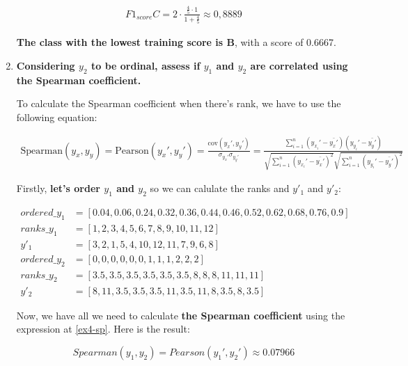 \documentclass[12pt]{article}
\begin{document}
\begin{enumerate}[leftmargin=\labelsep]
    \[
        \begin{aligned}
            F1_{score} C = 2 \cdot \frac{{ \frac{4}{5} \cdot 1 }}{{ 1 + \frac{4}{5} }} \approx 0,8889
        \end{aligned}
    \]

    \textbf{The class with the lowest training score is B}, with a score of 0.6667.

    \item \textbf{Considering $y_2$ to be ordinal, assess if $y_1$ and $y_2$ are correlated using the Spearman coefficient.}

    \vskip 0.3cm

    To calculate the Spearman coefficient when there's rank, we have to use the following equation:

    \begin{equation}\label{ex4-sp}
        \begin{split}
            \text{Spearman}(y_x, y_y) = \text{Pearson}(y_x', y_y') = \frac{\text{cov}(y_x', y_y')}{\sigma_{y_x'} \sigma_{y_y'}}
            = \frac{\sum_{i=1}^{n} (y_{x_i}' - \bar{y_x'})(y_{y_i}' - \bar{y_y'})}{\sqrt{\sum_{i=1}^{n} (y_{x_i}' - \bar{y_x'})^2}\sqrt{\sum_{i=1}^{n} (y_{y_i}' - \bar{y_y'})^2}}
        \end{split}
    \end{equation}

    Firstly, \textbf{let's order $y_1$ and $y_2$} so we can calulate the ranks and $y'_1$ and $y'_2$:

    \begin{align*}
        ordered\_y_{1} & = [0.04, 0.06, 0.24, 0.32, 0.36, 0.44, 0.46, 0.52, 0.62, 0.68, 0.76, 0.9]\\
        ranks\_y_{1}   & = [1,2,3,4,5,6,7,8,9,10,11,12]\\
        y'_{1}         & = [3,2,1,5,4,10,12,11,7,9,6,8]\\
        ordered\_y_{2} & = [0,0,0,0,0,0,1,1,1,2,2,2]\\
        ranks\_y_{2}   & = [3.5, 3.5, 3.5, 3.5, 3.5, 3.5, 8, 8, 8, 11, 11, 11]\\
        y'_{2}         & = [8, 11, 3.5, 3.5, 3.5, 11, 3.5, 11, 8, 3.5, 8, 3.5]
    \end{align*}

    Now, we have all we need to calculate \textbf{the Spearman coefficient} using the expression at \eqref{ex4-sp}. Here is the result:

    \[
        Spearman(y_{1}, y_{2}) = Pearson(y_{1}', y_{2}') \approx 0.07966
    \]


\end{enumerate}
\end{document}
